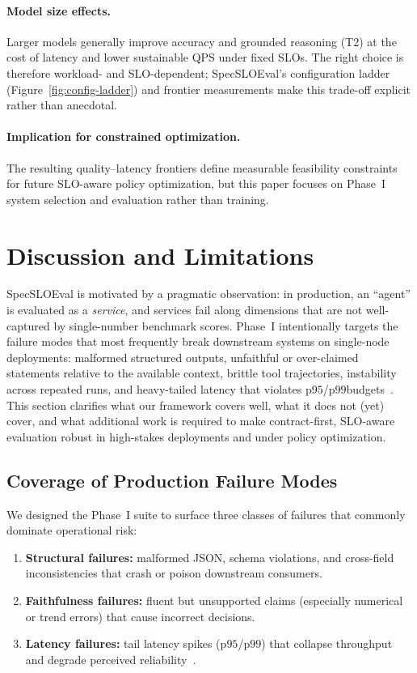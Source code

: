 \documentclass[11pt]{article}
\newcommand{\pninetyfive}{\ensuremath{\mathrm{p95}}}
\newcommand{\pninetynine}{\ensuremath{\mathrm{p99}}}
\begin{document}
\paragraph{Model size effects.}
Larger models generally improve accuracy and grounded reasoning (T2) at the cost of latency and lower sustainable QPS under fixed SLOs.
The right choice is therefore workload- and SLO-dependent; SpecSLOEval’s configuration ladder (Figure~\ref{fig:config-ladder}) and frontier measurements make this trade-off explicit rather than anecdotal.

\paragraph{Implication for constrained optimization.}
The resulting quality--latency frontiers define measurable feasibility constraints for future SLO-aware policy optimization, but this paper focuses on Phase~I system selection and evaluation rather than training.

\section{Discussion and Limitations}
\label{sec:discussion}

SpecSLOEval is motivated by a pragmatic observation: in production, an ``agent'' is evaluated as a \emph{service}, and services fail along dimensions that are not well-captured by single-number benchmark scores.
Phase~I intentionally targets the failure modes that most frequently break downstream systems on single-node deployments: malformed structured outputs, unfaithful or over-claimed statements relative to the available context, brittle tool trajectories, instability across repeated runs, and heavy-tailed latency that violates \pninetyfive/\pninetynine budgets~\citep{dean2013tail}.
This section clarifies what our framework covers well, what it does not (yet) cover, and what additional work is required to make contract-first, SLO-aware evaluation robust in high-stakes deployments and under policy optimization.

\subsection{Coverage of Production Failure Modes}

We designed the Phase~I suite to surface three classes of failures that commonly dominate operational risk:

\begin{enumerate}[leftmargin=12pt]
    \item \textbf{Structural failures:} malformed JSON, schema violations, and cross-field inconsistencies that crash or poison downstream consumers.
    \item \textbf{Faithfulness failures:} fluent but unsupported claims (especially numerical or trend errors) that cause incorrect decisions.
    \item \textbf{Latency failures:} tail latency spikes (\pninetyfive/\pninetynine) that collapse throughput and degrade perceived reliability~\citep{dean2013tail}.
\end{enumerate}
\end{document}
